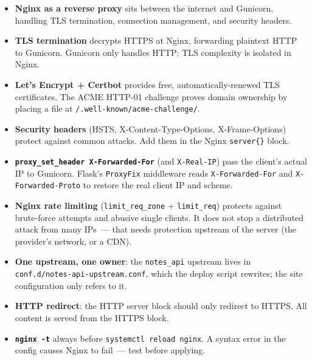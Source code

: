 \label{28-traffic-routing:key-takeaways}
\begin{takeaways}

\begin{itemize}
\tightlist
\item
  \textbf{Nginx as a reverse proxy} sits between the internet and Gunicorn, handling TLS termination, connection management, and security headers.
\item
  \textbf{TLS termination} decrypts HTTPS at Nginx, forwarding plaintext HTTP to Gunicorn. Gunicorn only handles HTTP; TLS complexity is isolated in Nginx.
\item
  \textbf{Let's Encrypt + Certbot} provides free, automatically-renewed TLS certificates. The ACME HTTP-01 challenge proves domain ownership by placing a file at \texttt{/}\allowbreak{}\texttt{.}\allowbreak{}\texttt{well-}\allowbreak{}\texttt{known/}\allowbreak{}\texttt{acme-}\allowbreak{}\texttt{challenge/}.
\item
  \textbf{Security headers} (HSTS, X-Content-Type-Options, X-Frame-Options) protect against common attacks. Add them in the Nginx \texttt{server\{\}} block.
\item
  \textbf{\texttt{proxy\_}\allowbreak{}\texttt{set\_}\allowbreak{}\texttt{header\ X-}\allowbreak{}\texttt{Forwarded-}\allowbreak{}\texttt{For}} (and \texttt{X-Real-IP}) pass the client's actual IP to Gunicorn. Flask's \texttt{ProxyFix} middleware reads \texttt{X-Forwarded-For} and \texttt{X-Forwarded-Proto} to restore the real client IP and scheme.
\item
  \textbf{Nginx rate limiting} (\texttt{limit\_req\_zone} + \texttt{limit\_req}) protects against brute-force attempts and abusive single clients. It does not stop a distributed attack from many IPs~--- that needs protection upstream of the server (the provider's network, or a CDN).
\item
  \textbf{One upstream, one owner}: the \texttt{notes\_api} upstream lives in \texttt{conf.}\allowbreak{}\texttt{d/}\allowbreak{}\texttt{notes-}\allowbreak{}\texttt{api-}\allowbreak{}\texttt{upstream.}\allowbreak{}\texttt{conf}, which the deploy script rewrites; the site configuration only refers to it.
\item
  \textbf{HTTP redirect}: the HTTP server block should only redirect to HTTPS. All content is served from the HTTPS block.
\item
  \textbf{\texttt{nginx\ -t}} always before \texttt{systemctl\ reload\ nginx}. A syntax error in the config causes Nginx to fail~--- test before applying.
\end{itemize}

\end{takeaways}

